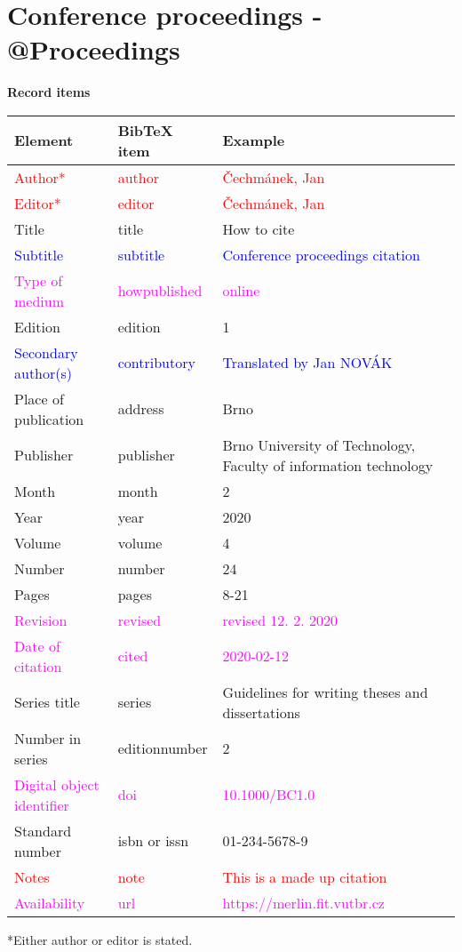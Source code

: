 \section*{Conference proceedings - @Proceedings}
\label{pr-sbornik}
\noindent \textbf{Record items}

\medskip

\begin{tabularx}{\linewidth}{X X X}
    Element & BibTeX item & Example\\\hline
    \textcolor{red}{Author*} & \textcolor{red}{author} & \textcolor{red}{Čechmánek, Jan}\\
    \textcolor{red}{Editor*} & \textcolor{red}{editor} & \textcolor{red}{Čechmánek, Jan}\\
    Title & title & How to cite\\
    \textcolor{blue}{Subtitle} & \textcolor{blue}{subtitle} & \textcolor{blue}{Conference proceedings citation}\\
    \textcolor{magenta}{Type of medium} & \textcolor{magenta}{howpublished} & \textcolor{magenta}{online}\\
    Edition & edition & 1\\
    \textcolor{blue}{Secondary author(s)} & \textcolor{blue}{contributory} & \textcolor{blue}{Translated by Jan NOVÁK}\\
    Place of publication & address & Brno\\
    Publisher & publisher & Brno University of Technology, Faculty of information technology\\
    Month & month & 2\\
    Year & year & 2020\\
    Volume & volume & 4\\
    Number & number & 24\\
    Pages & pages & 8-21\\
    \textcolor{magenta}{Revision} & \textcolor{magenta}{revised} & \textcolor{magenta}{revised 12. 2. 2020}\\
    \textcolor{magenta}{Date of citation} & \textcolor{magenta}{cited} & \textcolor{magenta}{2020-02-12}\\
    Series title & series & Guidelines for writing theses and dissertations\\
    Number in series & editionnumber & 2\\
    \textcolor{magenta}{Digital object identifier} & \textcolor{magenta}{doi} & \textcolor{magenta}{10.1000/BC1.0}\\
    Standard number & isbn or issn & 01-234-5678-9\\
    \textcolor{red}{Notes} & \textcolor{red}{note} & \textcolor{red}{This is a made up citation}\\
    \textcolor{magenta}{Availability} & \textcolor{magenta}{url} & \textcolor{magenta}{https://merlin.fit.vutbr.cz}
\end{tabularx}
*Either author or editor is stated.

